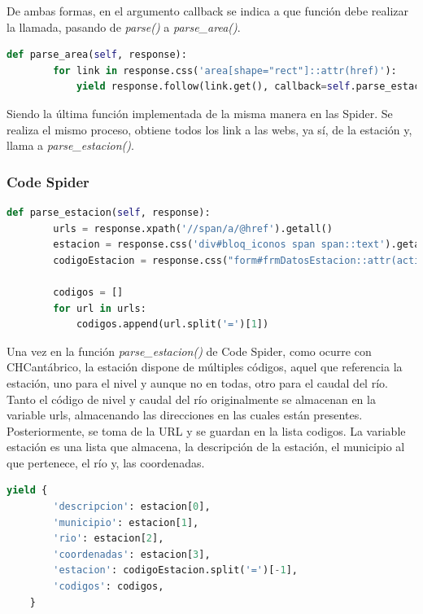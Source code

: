 De ambas formas, en el argumento callback se indica a que función debe realizar la llamada, pasando de \textit{parse()} a \textit{parse\_area()}.

\begin{lstlisting}[language=Python, caption={Función \textit{parse\_area()} Agua en Navarra Spiders}]
	def parse_area(self, response):
		for link in response.css('area[shape="rect"]::attr(href)'):
			yield response.follow(link.get(), callback=self.parse_estacion)
\end{lstlisting}

Siendo la última función implementada de la misma manera en las Spider. Se realiza el mismo proceso, obtiene todos los link a las webs, ya sí, de la estación y, llama a \textit{parse\_estacion()}.

\subsubsection{Code Spider}

\begin{lstlisting}[language=Python, caption={Función \textit{parse\_estacion()} Agua en Navarra Code Spider}]
	def parse_estacion(self, response):
		urls = response.xpath('//span/a/@href').getall()
		estacion = response.css('div#bloq_iconos span span::text').getall()
		codigoEstacion = response.css("form#frmDatosEstacion::attr(action)").get()
		
		codigos = []
		for url in urls:
			codigos.append(url.split('=')[1])
\end{lstlisting}

Una vez en la función \textit{parse\_estacion()} de Code Spider, como ocurre con CHCantábrico, la estación dispone de múltiples códigos, aquel que referencia la estación, uno para el nivel y aunque no en todas, otro para el caudal del río.\newline
\newline
Tanto el código de nivel y caudal del río originalmente se almacenan en la variable urls, almacenando las direcciones en las cuales están presentes. Posteriormente, se toma de la URL y se guardan en la lista codigos.\newline
\newline
La variable estación es una lista que almacena, la descripción de la estación, el municipio al que pertenece, el río y, las coordenadas.

\begin{lstlisting}[language=Python, caption={Guardado de datos de Agua en Navarra Code Spider}]
	yield {
		'descripcion': estacion[0],
		'municipio': estacion[1],
		'rio': estacion[2],
		'coordenadas': estacion[3],
		'estacion': codigoEstacion.split('=')[-1],
		'codigos': codigos,
	}
\end{lstlisting}

